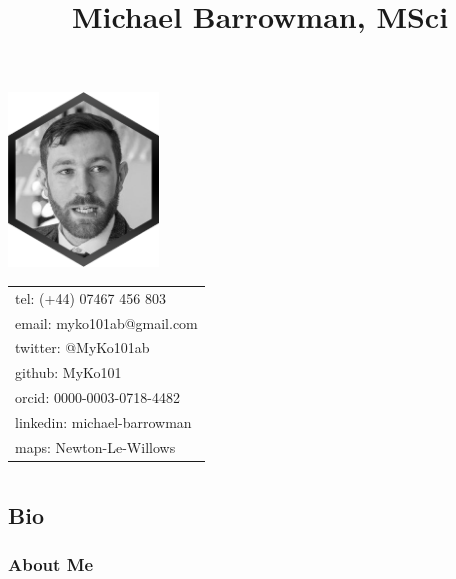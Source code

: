 \documentclass[
]{article}
\title{Michael Barrowman, MSci}
\author{}
\date{\vspace{-2.5em}}
\begin{document}
\maketitle

\setlength{\columnsep}{-2.5cm}
\def\addlinespace{}

\begin{multicols}{2}



\includegraphics[width=0.3\textwidth]{img/ProfileHex} 




\begin{tabular}{l}
\toprule
tel: (+44) 07467 456 803\\
email: myko101ab@gmail.com\\
twitter: @MyKo101ab\\
github: MyKo101\\
orcid: 0000-0003-0718-4482\\

linkedin: michael-barrowman\\
maps: Newton-Le-Willows\\
\bottomrule
\end{tabular}

\end{multicols}

\hypertarget{section}{%
\section{}\label{section}}

\hypertarget{bio}{%
\subsection{Bio}\label{bio}}

\hypertarget{about-me}{%
\subsubsection{About Me}\label{about-me}}
\end{document}
